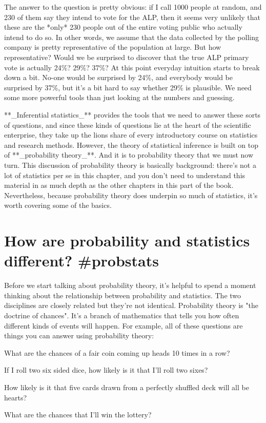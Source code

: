 The answer to the question is pretty obvious: if I call 1000 people at random, and 230 of them say they intend to vote for the ALP, then it seems very unlikely that these are the *only* 230 people out of the entire voting public who actually intend to do so. In other words, we assume that the data collected by the polling company is pretty representative of the population at large. But how representative? Would we be surprised to discover that the true ALP primary vote is actually 24\%? 29\%? 37\%? At this point everyday intuition starts to break down a bit. No-one would be surprised by 24\%, and everybody would be surprised by 37\%, but it's a bit hard to say whether 29\% is plausible. We need some more powerful tools than just looking at the numbers and guessing.

**_Inferential statistics_** provides the tools that we need to answer these sorts of questions, and since these kinds of questions lie at the heart of the scientific enterprise, they take up the lions share of every introductory course on statistics and research methods. However, the theory of statistical inference is built on top of **_probability theory_**. And it is to probability theory that we must now turn. This discussion of probability theory is basically background: there's not a lot of statistics per se in this chapter, and you don't need to understand this material in as much depth as the other chapters in this part of the book. Nevertheless, because probability theory does underpin so much of statistics, it's worth covering some of the basics. 


\section{How are probability and statistics different? {#probstats}}

Before we start talking about probability theory, it's helpful to spend a moment thinking about the relationship between probability and statistics. The two disciplines are closely related but they're not identical. Probability theory is "the doctrine of chances". It's a branch of mathematics that tells you how often different kinds of events will happen. For example, all of these questions are things you can answer using probability theory:

 \itemsep -2pt
\item What are the chances of a fair coin coming up heads 10 times in a row?
\item If I roll two six sided dice, how likely is it that I'll roll two sixes?
\item How likely is it that five cards drawn from a perfectly shuffled deck will all be hearts?
\item What are the chances that I'll win the lottery?



